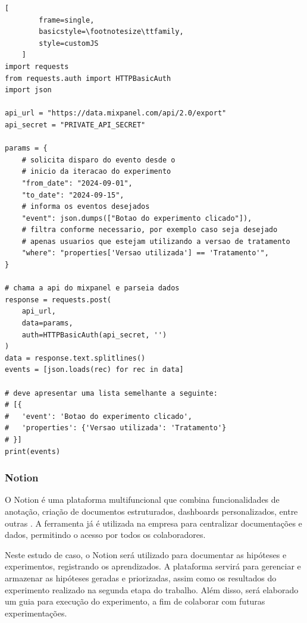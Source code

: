\begin{code}[!ht]
    \caption{Consumo da API do Mixpanel}
    \begin{lstlisting}[
        frame=single,
        basicstyle=\footnotesize\ttfamily,
        style=customJS
    ]
import requests
from requests.auth import HTTPBasicAuth
import json

api_url = "https://data.mixpanel.com/api/2.0/export"
api_secret = "PRIVATE_API_SECRET"

params = {
    # solicita disparo do evento desde o
    # inicio da iteracao do experimento
    "from_date": "2024-09-01",
    "to_date": "2024-09-15",
    # informa os eventos desejados
    "event": json.dumps(["Botao do experimento clicado"]),
    # filtra conforme necessario, por exemplo caso seja desejado
    # apenas usuarios que estejam utilizando a versao de tratamento
    "where": "properties['Versao utilizada'] == 'Tratamento'",
}

# chama a api do mixpanel e parseia dados
response = requests.post(
    api_url, 
    data=params, 
    auth=HTTPBasicAuth(api_secret, '')
)
data = response.text.splitlines()
events = [json.loads(rec) for rec in data]

# deve apresentar uma lista semelhante a seguinte:
# [{
#   'event': 'Botao do experimento clicado',
#   'properties': {'Versao utilizada': 'Tratamento'}
# }]
print(events)
    \end{lstlisting}
    \label{code:mixpanel-api}
\end{code}

\subsubsection{Notion}

O Notion é uma plataforma multifuncional que combina funcionalidades de anotação, criação de documentos estruturados, dashboards personalizados, entre outras \cite{notion}. A ferramenta já é utilizada na empresa para centralizar documentações e dados, permitindo o acesso por todos os colaboradores.

Neste estudo de caso, o Notion será utilizado para documentar as hipóteses e experimentos, registrando os aprendizados. A plataforma servirá para gerenciar e armazenar as hipóteses geradas e priorizadas, assim como os resultados do experimento realizado na segunda etapa do trabalho. Além disso, será elaborado um guia para execução do experimento, a fim de colaborar com futuras experimentações.

